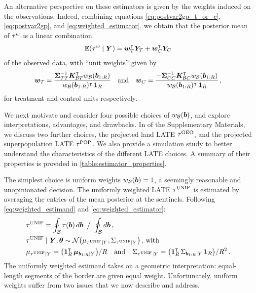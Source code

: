 An alternative perspective on these estimators is given by the weights induced on the observations.
Indeed, combining equations \autoref{eq:postvar2gp_t_or_c}, \autoref{eq:postvar2gp}, and \autoref{eq:weighted_estimator}, we obtain that the posterior mean of \(\tau^{w}\) is a linear combination
\begin{equation}
    \E\del{\tauw \mid \Yvec} = \wt\trans \yt + \wc\trans \yc
    \label{eq:unit_weights}
\end{equation}
of the observed data, with ``unit weights'' given by
\begin{equation}
        \bm{w}_{T} = \frac{
            \bm{\Sigma}_{T T}^{-1} 
            \bm{K}_{\mathcal{B} T}^{\intercal} w_{\mathcal{B}}(\bm{b}_{1:R})
        }{
            w_{\mathcal{B}}(\bm{b}_{1:R})^{\intercal} \operatorname{\mathbf{1}}_{R}
        }
        \quad\text{and}\quad
        \bm{w}_{C} = \frac{
            -
            \bm{\Sigma}_{C C}^{-1} 
            \bm{K}_{\mathcal{B} C}^{\intercal} w_{\mathcal{B}}(\bm{b}_{1:R})
        }{
            w_{\mathcal{B}}(\bm{b}_{1:R})^{\intercal} \operatorname{\mathbf{1}}_{R}
        }
        \,,
    \label{eq:unit_weights_gp}
\end{equation}
for treatment and control units respectively.

We next motivate and consider four possible choices of \(w_{\mathcal{B}}(\bm{b})\), and explore interpretations, advantages, and drawbacks. 
In  of the Supplementary Materials, we discuss two further choices, the projected land LATE \(\tau^{\mathrm{GEO}}\), and the projected superpopulation LATE \(\tau^{\mathrm{POP}}\).
We also provide a simulation study to better understand the characteristics of the different LATE choices.
A summary of their properties is provided in \autoref{table:estimator_properties}.

The simplest choice is uniform weights \(w_{\mathcal{B}}(\bm{b})=1\), a seemingly reasonable and unopinionated decision.
The uniformly weighted LATE \(\tau^{\mathrm{UNIF}}\) is estimated by averaging the entries of the mean posterior at the sentinels.
Following \autoref{eq:weighted_estimand} and \autoref{eq:weighted_estimator}:
\begin{equation}\begin{split}
    &\unifavg = \oint_\border \tau(\sentinel) \dif\sentinel
        \ \big/ \ 
        \oint_\border \dif{\sentinel}  \,, \\
    &\unifavg \mid \Yvec, \hyperparam \sim \normal\del{\mu_{\unifavg \mid Y}, \Sigma_{\unifavg \mid Y}}\,\text{, with} \\
    &\mu_{\unifavg \mid Y} = \del{\ones_{\numsent}\trans \muvec_{\sentinels \mid Y}} / \numsent \quad\text{and}\quad
    \Sigma_{\unifavg \mid Y} = \del{\ones_{\numsent}\trans \Sigma_{\sentinels \mid Y} \ones_{\numsent}} / \numsent^2 \,.
\end{split}
\label{eq:unifavg}
\end{equation}
The uniformly weighted estimand takes on a geometric interpretation: equal-length segments of the border are given equal weight.
Unfortunately, uniform weights suffer from two issues that we now describe and address.

